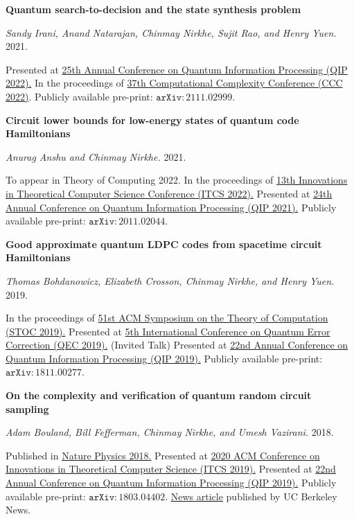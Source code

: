 \documentclass[11pt]{article}
\begin{document}
\begin{enumerate}[{leftmargin=*,start=10,label=[\arabic*]\addtocounter{enumi}{-2}}]
\item \textbf{Quantum search-to-decision and the state synthesis problem}

\emph{Sandy Irani, Anand Natarajan, Chinmay Nirkhe, Sujit Rao, and Henry Yuen.} 2021.

Presented at \href{https://web.cvent.com/event/8adf8248-432b-499c-91e2-63b83ba3f69e/summary}{25th Annual Conference on Quantum Information Processing (QIP 2022).}
In the proceedings of \href{https://www.computationalcomplexity.org/}{37th Computational Complexity Conference (CCC 2022)}. Publicly available pre-print: \href{https://arxiv.org/abs/2111.02999}{$\mathtt{arXiv:2111.02999}$}.

\item \textbf{Circuit lower bounds for low-energy states of quantum code Hamiltonians}

\emph{Anurag Anshu and Chinmay Nirkhe.} 2021.

To appear in Theory of Computing 2022. In the proceedings of \href{http://itcs-conf.org/itcs22/itcs22-cfp.html}{13th Innovations in Theoretical Computer Science Conference (ITCS 2022).}
Presented at \href{https://www.mcqst.de/qip2021/}{24th Annual Conference on Quantum Information Processing (QIP 2021).} Publicly available pre-print: \href{https://arxiv.org/abs/2011.02044}{$\mathtt{arXiv:2011.02044}$}.

\item \textbf{Good approximate quantum LDPC codes from spacetime circuit Hamiltonians}

\emph{Thomas Bohdanowicz, Elizabeth Crosson, Chinmay Nirkhe, and Henry Yuen.} 2019.

In the proceedings of \href{http://acm-stoc.org/stoc2019/}{51st ACM Symposium on the Theory of Computation (STOC 2019).}
Presented at \href{http://qec19.iopconfs.org/home}{5th International Conference on Quantum Error Correction (QEC 2019).} (Invited Talk)
Presented at \href{https://jila.colorado.edu/qip2019/}{22nd Annual Conference on Quantum Information Processing (QIP 2019).}
Publicly available pre-print: \href{https://arxiv.org/abs/1811.00277}{$\mathtt{arXiv:1811.00277}$}.

\item \textbf{On the complexity and verification of quantum random circuit sampling}

\emph{Adam Bouland, Bill Fefferman, Chinmay Nirkhe, and Umesh Vazirani.} 2018.

Published in \href{https://www.nature.com/articles/s41567-018-0318-2}{Nature Physics 2018.}
Presented at \href{http://itcs-conf.org/itcs19/itcs19-cfp.html}{2020 ACM Conference on Innovations in Theoretical Computer Science (ITCS 2019).}
Presented at \href{https://jila.colorado.edu/qip2019/}{22nd Annual Conference on Quantum Information Processing (QIP 2019).}
Publicly available pre-print: \href{https://arxiv.org/abs/1803.04402}{$\mathtt{arXiv:1803.04402}$}.
\href{https://news.berkeley.edu/2018/10/29/berkeley-computer-theorists-show-path-to-verifying-that-quantum-beats-classical/}{News article} published by UC Berkeley News.


\end{enumerate}
\end{document}
